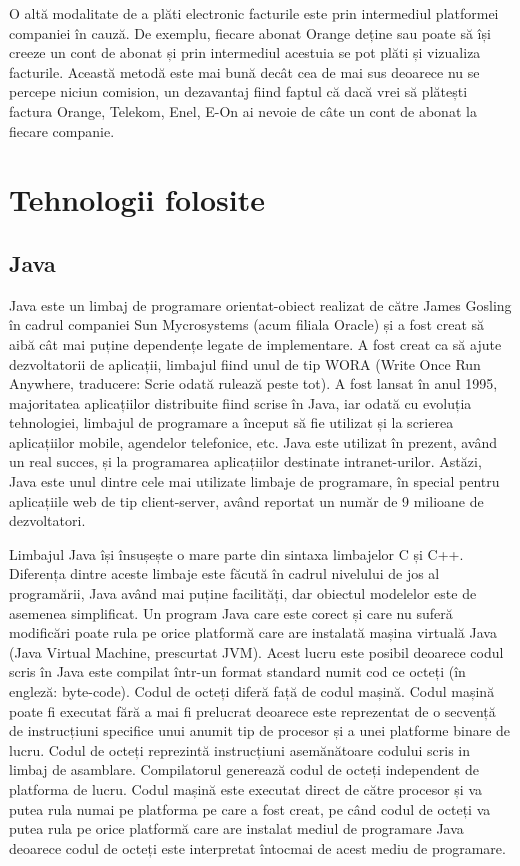 \documentclass[12pt]{book}
\begin{document}
O altă modalitate de a plăti electronic facturile este prin intermediul platformei companiei în cauză. De exemplu, fiecare abonat Orange deține sau poate să își creeze un cont de abonat și prin intermediul acestuia se pot plăti și vizualiza facturile. Această metodă este mai bună decât cea de mai sus deoarece nu se percepe niciun comision, un dezavantaj fiind faptul că dacă vrei să plătești factura Orange, Telekom, Enel, E-On ai nevoie de câte un cont de abonat la fiecare companie. 

\chapter{Tehnologii folosite}
\section{Java}
	
Java este un limbaj de programare orientat-obiect realizat de către James Gosling în cadrul companiei Sun Mycrosystems (acum filiala Oracle) și a fost creat să aibă cât mai puține dependențe legate de implementare. A fost creat ca să ajute dezvoltatorii de aplicații, limbajul fiind unul de tip WORA (Write Once Run Anywhere, traducere: Scrie odată rulează peste tot).  A fost lansat în anul 1995, majoritatea aplicațiilor distribuite fiind scrise în Java, iar odată cu evoluția tehnologiei, limbajul de programare a început să fie utilizat și la scrierea aplicațiilor mobile, agendelor telefonice, etc. Java este utilizat în prezent, având un real succes, și la programarea aplicațiilor destinate intranet-urilor. Astăzi, Java este unul dintre cele mai utilizate limbaje de programare, în special pentru aplicațiile web de tip client-server, având reportat un număr de 9 milioane de dezvoltatori. \cite{thinkJava}
	
Limbajul Java își însușește o mare parte din sintaxa limbajelor C și C++. Diferența dintre aceste limbaje este făcută în cadrul nivelului de jos al programării, Java având mai puține facilități, dar obiectul modelelor este de asemenea simplificat. Un program Java care este corect și care nu suferă modificări poate rula pe orice platformă care are instalată mașina virtuală Java (Java Virtual Machine, prescurtat JVM). Acest lucru este posibil deoarece codul scris în Java este compilat într-un format standard numit cod ce octeți (în engleză: byte-code). Codul de octeți diferă față de codul mașină. Codul mașină poate fi executat fără a mai fi prelucrat deoarece este reprezentat de o secvență de instrucțiuni specifice unui anumit tip de procesor și a unei platforme binare de lucru. Codul de octeți reprezintă instrucțiuni asemănătoare codului scris in limbaj de asamblare. Compilatorul generează codul de octeți independent de platforma de lucru. Codul mașină este executat direct de către procesor și va putea rula numai pe platforma pe care a fost creat, pe când codul de octeți va putea rula pe orice platformă care are instalat mediul de programare Java deoarece codul de octeți este interpretat întocmai de acest mediu de programare. \cite{cursPracticJava}
\end{document}

